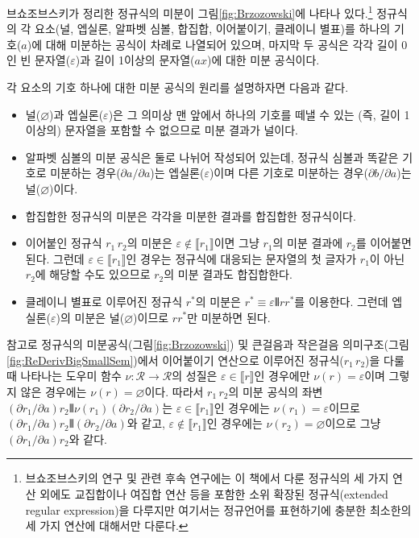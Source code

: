 브쇼조브스키가 정리한 정규식의 미분이 그림\;\ref{fig:Brzozowski}에
나타나 있다.\footnote{브쇼조브스키의 연구 및 관련 후속 연구에는
이 책에서 다룬 정규식의 세 가지 연산 외에도 교집합이나 여집합 연산 등을
포함한 소위 확장된 정규식(extended regular expression)을 다루지만 여기서는
정규언어를 표현하기에 충분한 최소한의 세 가지 연산에 대해서만 다룬다.}
정규식의 각 요소(널, 엡실론, 알파벳 심볼, 합집합, 이어붙이기,
클레이니 별표)를 하나의 기호($a$)에 대해 미분하는 공식이 차례로 나열되어
있으며, 마지막 두 공식은 각각 길이 0인 빈 문자열($\varepsilon$)과 길이
1이상의 문자열($ax$)에 대한 미분 공식이다.

각 요소의 기호 하나에 대한 미분 공식의 원리를 설명하자면 다음과 같다.
\begin{itemize}\tightlist
 \item 널($\varnothing$)과 엡실론($\varepsilon$)은 그 의미상
       맨 앞에서 하나의 기호를 떼낼 수 있는 (즉, 길이 1이상의)
       문자열을 포함할 수 없으므로 미분 결과가 널이다.
 \item 알파벳 심볼의 미분 공식은 둘로 나뉘어 작성되어 있는데,
   정규식 심볼과 똑같은 기호로 미분하는 경우($\partial a/\partial a$)는
   엡실론($\varepsilon$)이며
   다른 기호로 미분하는 경우($\partial b/\partial a$)는
   널($\varnothing$)이다.
 \item 합집합한 정규식의 미분은 각각을 미분한 결과를 합집합한 정규식이다.
 \item 이어붙인 정규식 $r_1\,r_2$의 미분은
       $\varepsilon\notin\llbracket r_1\rrbracket$이면 그냥
       $r_1$의 미분 결과에 $r_2$를 이어붙면 된다.
       그런데 $\varepsilon\in\llbracket r_1\rrbracket$인 경우는
       정규식에 대응되는 문자열의 첫 글자가 $r_1$이 아닌 $r_2$에
       해당할 수도 있으므로 $r_2$의 미분 결과도 합집합한다.
 \item 클레이니 별표로 이루어진 정규식 $r^{*}$의 미분은
       $r^{*}\equiv \varepsilon\VERT rr^{*}$를 이용한다.
       그런데 엡실론($\varepsilon$)의 미분은 널($\varnothing$)이므로
       $rr^{*}$만 미분하면 된다.\vspace*{-1ex}
\end{itemize}
참고로 정규식의 미분공식(그림\;\ref{fig:Brzozowski}) 및
큰걸음과 작은걸음 의미구조(그림\;\ref{fig:ReDerivBigSmallSem})에서
이어붙이기 연산으로 이루어진 정규식($r_1\,r_2$)을 다룰 때 나타나는
도우미 함수 $\nu:\mathcal{R}\to\mathcal{R}$의 성질은
$\varepsilon \in \llbracket r \rrbracket$인 경우에만
$\nu(r)=\varepsilon$이며 그렇지 않은 경우에는
$\nu(r)=\varnothing$이다. 따라서 $r_1\,r_2$의 미분 공식의 좌변
$(\partial r_1/\partial a)r_2\VERT\nu(r_1)(\partial r_2/\partial a)$는
$\varepsilon \in \llbracket r_1 \rrbracket$인 경우에는
$\nu(r_1)=\varepsilon$이므로
$(\partial r_1/\partial a)r_2\VERT(\partial r_2/\partial a)$와 같고,
$\varepsilon \notin \llbracket r_1 \rrbracket$인 경우에는
$\nu(r_2)=\varnothing$이으로 그냥 $(\partial r_1/\partial a)r_2$와 같다.

